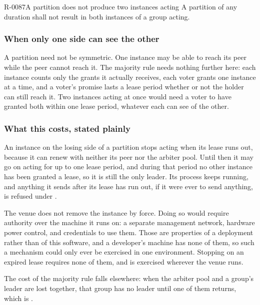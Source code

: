 \begin{requirement}{R-0087}{A partition does not produce two instances acting}
  A partition of any duration shall not result in both instances of a group
  acting.
\end{requirement}

\subsubsection{When only one side can see the other}
\label{sec:ha:enabled:partition:asymmetric}

A partition need not be symmetric. One instance may be able to reach its peer
while the peer cannot reach it. The majority rule needs nothing further here:
each instance counts only the grants it actually receives, each voter grants one
instance at a time, and a voter's promise lasts a lease period whether or not the
holder can still reach it. Two instances acting at once would need a voter to
have granted both within one lease period, whatever each can see of the other.

\subsubsection{What this costs, stated plainly}
\label{sec:ha:enabled:partition:cost}

An instance on the losing side of a partition stops acting when its lease runs
out, because it can renew with neither its peer nor the arbiter pool. Until then it
may go on acting for up to one lease period, and during that period no other
instance has been granted a lease, so it is still the only leader. Its process
keeps running, and anything it sends after its lease has run out, if it were ever
to send anything, is refused under .

The venue does not remove the instance by force. Doing so would require authority
over the machine it runs on: a separate management network, hardware power
control, and credentials to use them. Those are properties of a deployment rather
than of this software, and a developer's machine has none of them, so such a
mechanism could only ever be exercised in one environment. Stopping on an
expired lease requires none of them, and is exercised wherever the venue runs.

The cost of the majority rule falls elsewhere: when the arbiter pool and a
group's leader are lost together, that group has no leader until one of them
returns, which is .
